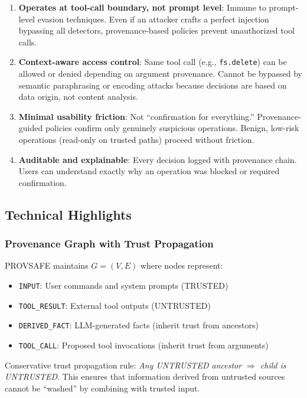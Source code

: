 \begin{enumerate}[leftmargin=1.2em]
  \item \textbf{Operates at tool-call boundary, not prompt level}: Immune to prompt-level evasion techniques. Even if an attacker crafts a perfect injection bypassing all detectors, provenance-based policies prevent unauthorized tool calls.
  
  \item \textbf{Context-aware access control}: Same tool call (e.g., \texttt{fs.delete}) can be allowed or denied depending on argument provenance. Cannot be bypassed by semantic paraphrasing or encoding attacks because decisions are based on data origin, not content analysis.
  
  \item \textbf{Minimal usability friction}: Not ``confirmation for everything.'' Provenance-guided policies confirm only genuinely suspicious operations. Benign, low-risk operations (read-only on trusted paths) proceed without friction.
  
  \item \textbf{Auditable and explainable}: Every decision logged with provenance chain. Users can understand exactly why an operation was blocked or required confirmation.
\end{enumerate}

\subsection{Technical Highlights}

\subsubsection{Provenance Graph with Trust Propagation}

PROVSAFE maintains $G = (V, E)$ where nodes represent:
\begin{itemize}[leftmargin=1.2em]
  \item \texttt{INPUT}: User commands and system prompts (TRUSTED)
  \item \texttt{TOOL\_RESULT}: External tool outputs (UNTRUSTED)
  \item \texttt{DERIVED\_FACT}: LLM-generated facts (inherit trust from ancestors)
  \item \texttt{TOOL\_CALL}: Proposed tool invocations (inherit trust from arguments)
\end{itemize}

Conservative trust propagation rule: \emph{Any UNTRUSTED ancestor $\Rightarrow$ child is UNTRUSTED}. This ensures that information derived from untrusted sources cannot be ``washed'' by combining with trusted input.

